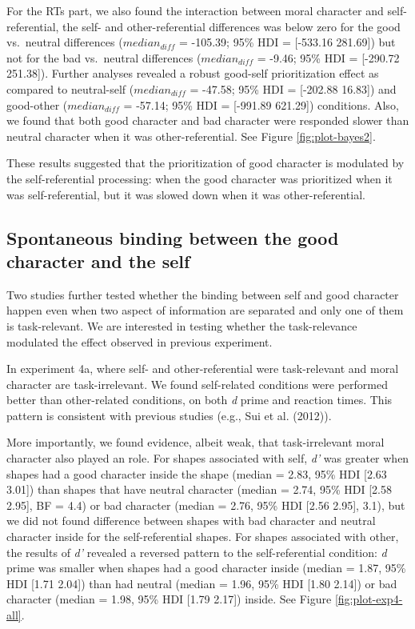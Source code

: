 \documentclass[
  man]{apa6}
\begin{document}
For the RTs part, we also found the interaction between moral character and self-referential, the self- and other-referential differences was below zero for the good vs.~neutral differences (\(median_{diff}\) = -105.39; 95\% HDI = {[}-533.16 281.69{]}) but not for the bad vs.~neutral differences (\(median_{diff}\) = -9.46; 95\% HDI = {[}-290.72 251.38{]}). Further analyses revealed a robust good-self prioritization effect as compared to neutral-self (\(median_{diff}\) = -47.58; 95\% HDI = {[}-202.88 16.83{]}) and good-other (\(median_{diff}\) = -57.14; 95\% HDI = {[}-991.89 621.29{]}) conditions. Also, we found that both good character and bad character were responded slower than neutral character when it was other-referential. See Figure \ref{fig:plot-bayes2}.

These results suggested that the prioritization of good character is modulated by the self-referential processing: when the good character was prioritized when it was self-referential, but it was slowed down when it was other-referential.

\hypertarget{spontaneous-binding-between-the-good-character-and-the-self}{%
\subsection{Spontaneous binding between the good character and the self}\label{spontaneous-binding-between-the-good-character-and-the-self}}

Two studies further tested whether the binding between self and good character happen even when two aspect of information are separated and only one of them is task-relevant. We are interested in testing whether the task-relevance modulated the effect observed in previous experiment.

In experiment 4a, where self- and other-referential were task-relevant and moral character are task-irrelevant. We found self-related conditions were performed better than other-related conditions, on both \emph{d} prime and reaction times. This pattern is consistent with previous studies (e.g., Sui et al. (2012)).

More importantly, we found evidence, albeit weak, that task-irrelevant moral character also played an role. For shapes associated with self, \emph{d'} was greater when shapes had a good character inside the shape (median = 2.83, 95\% HDI {[}2.63 3.01{]}) than shapes that have neutral character (median = 2.74, 95\% HDI {[}2.58 2.95{]}, BF = 4.4) or bad character (median = 2.76, 95\% HDI {[}2.56 2.95{]}, 3.1), but we did not found difference between shapes with bad character and neutral character inside for the self-referential shapes. For shapes associated with other, the results of \emph{d'} revealed a reversed pattern to the self-referential condition: \emph{d} prime was smaller when shapes had a good character inside (median = 1.87, 95\% HDI {[}1.71 2.04{]}) than had neutral (median = 1.96, 95\% HDI {[}1.80 2.14{]}) or bad character (median = 1.98, 95\% HDI {[}1.79 2.17{]}) inside. See Figure \ref{fig:plot-exp4-all}.
\end{document}
